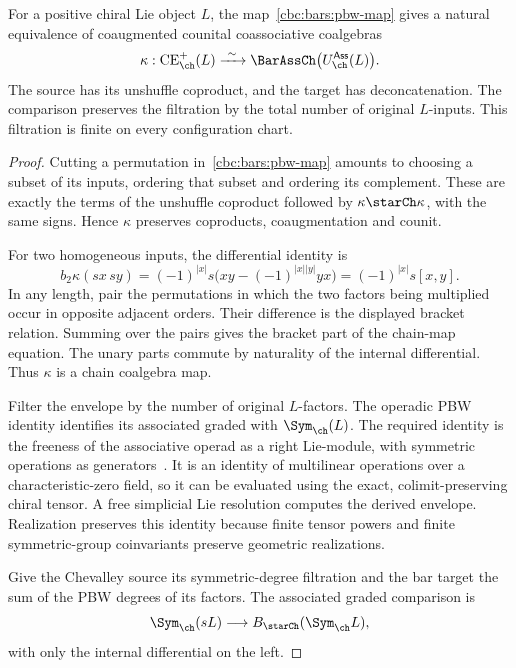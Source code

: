 \begin{theorem}\label{cbc:bars:pbw}
For a positive chiral Lie object $L$, the map~\eqref{cbc:bars:pbw-map} gives a natural equivalence of coaugmented counital coassociative coalgebras
\[
 \kappa:\operatorname{CE}_{\ch}^+(L)
 \xrightarrow{\ \sim\ }
 \BarAssCh\bigl(U_{\ch}^{\mathsf{Ass}}(L)\bigr).
\]
The source has its unshuffle coproduct, and the target has deconcatenation. The comparison preserves the filtration by the total number of original $L$-inputs. This filtration is finite on every configuration chart.
\end{theorem}
\begin{proof}
Cutting a permutation in~\eqref{cbc:bars:pbw-map} amounts to choosing a subset of its inputs, ordering that subset and ordering its complement. These are exactly the terms of the unshuffle coproduct followed by $\kappa\starCh\kappa$, with the same signs. Hence $\kappa$ preserves coproducts, coaugmentation and counit.

For two homogeneous inputs, the differential identity is
\[
 b_2\kappa(sx\,sy)
 =(-1)^{|x|}s\bigl(xy-(-1)^{|x||y|}yx\bigr)
 =(-1)^{|x|}s[x,y].
\]
In any length, pair the permutations in which the two factors being multiplied occur in opposite adjacent orders. Their difference is the displayed bracket relation. Summing over the pairs gives the bracket part of the chain-map equation. The unary parts commute by naturality of the internal differential. Thus $\kappa$ is a chain coalgebra map.

Filter the envelope by the number of original $L$-factors. The operadic PBW identity identifies its associated graded with $\Sym_{\ch}(L)$. The required identity is the freeness of the associative operad as a right Lie-module, with symmetric operations as generators~\cite[Theorem~4.2 and Proposition~4.4]{DotsenkoTamaroffPBW}. It is an identity of multilinear operations over a characteristic-zero field, so it can be evaluated using the exact, colimit-preserving chiral tensor. A free simplicial Lie resolution computes the derived envelope. Realization preserves this identity because finite tensor powers and finite symmetric-group coinvariants preserve geometric realizations.

Give the Chevalley source its symmetric-degree filtration and the bar target the sum of the PBW degrees of its factors. The associated graded comparison is
\begin{equation}\label{cbc:bars:abelian-koszul}
 \Sym_{\ch}(sL)\longrightarrow B_{\starCh}(\Sym_{\ch}L),
\end{equation}
with only the internal differential on the left.


\end{proof}
